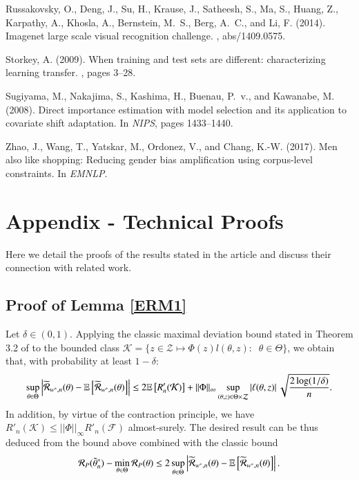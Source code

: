\documentclass[12pt]{article}
\newcommand{\cR}{{\cal R}}
\begin{document}
\begin{thebibliography}{}
Russakovsky, O., Deng, J., Su, H., Krause, J., Satheesh, S., Ma, S., Huang, Z.,
  Karpathy, A., Khosla, A., Bernstein, M.~S., Berg, A.~C., and Li, F. (2014).
\newblock Imagenet large scale visual recognition challenge.
, abs/1409.0575.

Storkey, A. (2009).
\newblock When training and test sets are different: characterizing learning
  transfer.
, pages 3--28.

Sugiyama, M., Nakajima, S., Kashima, H., Buenau, P.~v., and Kawanabe, M.
  (2008).
\newblock Direct importance estimation with model selection and its application
  to covariate shift adaptation.
\newblock In {\em NIPS}, pages 1433--1440.

Zhao, J., Wang, T., Yatskar, M., Ordonez, V., and Chang, K.-W. (2017).
\newblock Men also like shopping: Reducing gender bias amplification using
  corpus-level constraints.
\newblock In {\em EMNLP}.

\end{thebibliography}
 



\newpage

\section*{Appendix - Technical Proofs}

Here we detail the proofs of the results stated in the article and discuss their connection with related work.

\subsection*{Proof of Lemma \ref{ERM1}}
Let $\delta\in (0,1)$. Applying the classic maximal deviation bound stated in Theorem 3.2 of \cite{Boucheron2005} to the bounded class $\mathcal{K}=\{z\in\mathcal{Z}\mapsto \Phi(z)l(\theta, z):\;\; \theta\in \Theta  \}$, we obtain that, with probability at least $1-\delta$:
$$
\sup_{\theta\in\Theta}\left\vert \widetilde{\cR}_{w^*,n}(\theta)- \mathbb{E}\left[ \widetilde{\cR}_{w^*,n}(\theta) \right]  \right\vert \leq 2\mathbb{E}\left[R'_n(\mathcal{K})  \right]+\vert\vert \Phi\vert\vert_{\infty}\sup_{(\theta,z)\in \Theta\times \mathcal{Z}}\left\vert \ell(\theta, z) \right\vert \sqrt{\frac{2\log (1/\delta)}{n}}.
$$
In addition, by virtue of the contraction principle, we have $R'_n(\mathcal{K})\leq \vert\vert \Phi\vert\vert_{\infty} R'_n(\mathcal{F})$ almost-surely. The desired result can be thus deduced from the bound above combined with the classic bound
$$
 \cR_P (\tilde{\theta}^*_n) - \min_{\theta\in \Theta}\cR_P(\theta)\leq 2\sup_{\theta\in\Theta}\left\vert \widetilde{\cR}_{w^*,n}(\theta)- \mathbb{E}\left[ \widetilde{\cR}_{w^*,n}(\theta) \right]  \right\vert.
$$
\end{document}
